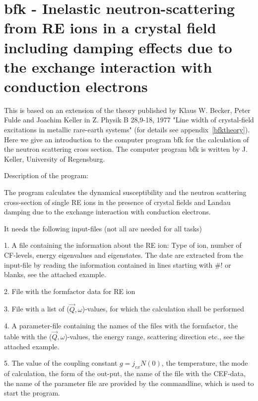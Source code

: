 


%

\section{{\prg bfk} - Inelastic neutron-scattering from RE ions in a crystal field
including damping effects due to the exchange interaction with conduction
electrons}

\bigskip
This is based on an extension  of the theory published by Klaus W. Becker, Peter Fulde and
Joachim Keller in Z. Physik B 28,9-18, 1977 
"Line width of crystal-field excitations in metallic rare-earth systems"
(for details see appendix~\ref{bfktheory}).
Here we give an  introduction to the computer program {\prg bfk} for the calculation of  the neutron 
scattering cross section. The computer program {\prg bfk} is written by J. Keller,
University of Regensburg.


{\large Description of the program:}

The program calculates the dynamical susceptibility
and the neutron scattering cross-section of single RE ions in the presence
of crystal fields and Landau damping due to the exchange interaction with 
conduction electrons.

It needs the following input-files (not all are needed for all tasks)

1. A file containing the information about the RE ion: Type of ion, number of
CF-levels, energy eigenvalues and eigenstates. The date are extracted from
the input-file by reading the information contained in lines starting with
$\#!$ or blanks, see the attached example. 

2. File with the formfactor data for RE ion

3. File with a list of ($\vec Q,\omega$)-values, for which the calculation
shall be performed

4. A parameter-file containing  the names of the files with the
formfactor, the  table with the ($\vec Q,\omega$)-values, the energy range, 
scattering direction etc., see the attached example.

5. The value of the coupling constant $g=j_{ex}N(0)$, the temperature,  
the mode of calculation, the form of the out-put, the name of the file with
the CEF-data, the  name of the parameter file are provided by the
commandline, which is used to start the program. 


